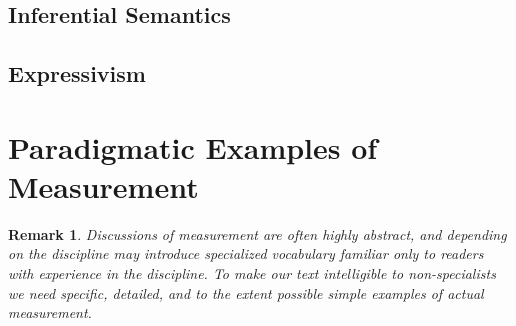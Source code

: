 \documentclass[11pt,twoside]{article}
\newtheorem{remark}{Remark}
\begin{document}
\subsection{Inferential Semantics}

\subsection{Expressivism}

\section{Paradigmatic Examples of Measurement}

\begin{remark}
Discussions of measurement are often highly abstract, and depending on
the discipline may introduce specialized vocabulary familiar only to
readers with experience in the discipline.  To make our text
intelligible to non-specialists we need specific, detailed, and to the
extent possible simple examples of actual measurement.
\end{remark}
\end{document}
